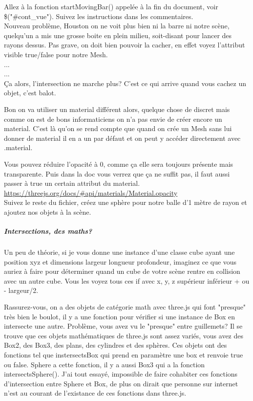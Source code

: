 \documentclass[a4paper,10pt]{article}
\begin{document}
Allez à la fonction startMovingBar() appelée à la fin du document, voir \$("\#cont_vue").
Suivez les instructions dans les commentaires.\\


Nouveau problème, Houston on ne voit plus bien ni la barre ni notre scène, quelqu'un a mis une grosse boite en plein milieu, soit-disant pour lancer des rayons dessus.
Pas grave, on doit bien pouvoir la cacher, en effet voyez l'attribut visible true/false pour notre Mesh. \\
...\\
...\\
Ça alors, l'intersection ne marche plus? C'est ce qui arrive quand vous cachez un objet, c'est balot.

Bon on va utiliser un material différent alors, quelque chose de discret mais comme on est de bons informaticiens on n'a pas envie de créer encore un material. C'est là qu'on se rend compte que quand on crée un Mesh sans lui donner de material il en a un par défaut et on peut y accéder directement avec .material.

 Vous pouvez réduire l'opacité à 0, comme ça elle sera toujours présente mais transparente.
Puis dans la doc vous verrez que ça ne suffit pas, il faut aussi passer à true un certain attribut du material.
\url{https://threejs.org/docs/#api/materials/Material.opacity} \\

Suivez le reste du fichier, créez une sphère pour notre balle d'1 mètre de rayon et ajoutez nos objets à la scène.

\subparagraph{Intersections, des maths?}
Un peu de théorie, si je vous donne une instance d'une classe cube ayant une position xyz et dimensions largeur longueur profondeur, imaginez ce que vous auriez à faire pour déterminer quand un cube de votre scène rentre en collision avec un autre cube. Vous les voyez tous ces if avec x, y, z supérieur inférieur + ou - largeur/2.

Rassurez-vous, on a des objets de catégorie math avec three.js qui font "presque" très bien le boulot, il y a une fonction pour vérifier si une instance de Box en intersecte une autre.
Problème, vous avez vu le "presque" entre guillemets? Il se trouve que ces objets mathématiques de three.js sont assez variés, vous avez des Box2, des Box3, des plans, des cylindres et des sphères. Ces objets ont des fonctions tel que instersectsBox qui prend en paramètre une box et renvoie true ou false. Sphere a cette fonction, il y a aussi Box3 qui a la fonction intersectsSphere(). J'ai tout essayé, impossible de faire cohabiter ces fonctions d'intersection entre Sphere et Box, de plus on dirait que personne sur internet n'est au courant de l'existance de ces fonctions dans three.js.
\end{document}
